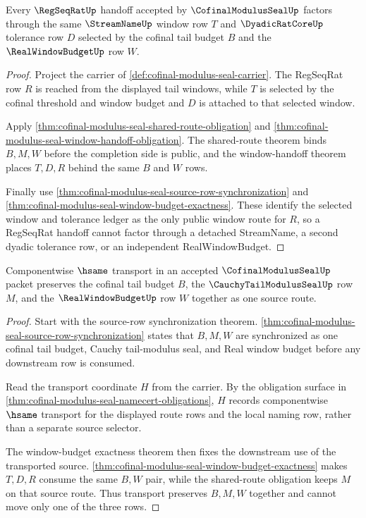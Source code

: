 \begin{theorem}
\label{thm:cofinal-modulus-seal-regseqrat-window-factorization}
Every $\RegSeqRatUp$ handoff accepted by $\CofinalModulusSealUp$ factors through the same $\StreamNameUp$ window row $T$ and $\DyadicRatCoreUp$ tolerance row $D$ selected by the cofinal tail budget $B$ and the $\RealWindowBudgetUp$ row $W$.
\end{theorem}
\begin{proof}
Project the carrier of \autoref{def:cofinal-modulus-seal-carrier}. The RegSeqRat row $R$ is reached from the displayed tail windows, while $T$ is selected by the cofinal threshold and window budget and $D$ is attached to that selected window.

Apply \autoref{thm:cofinal-modulus-seal-shared-route-obligation} and \autoref{thm:cofinal-modulus-seal-window-handoff-obligation}. The shared-route theorem binds $B,M,W$ before the completion side is public, and the window-handoff theorem places $T,D,R$ behind the same $B$ and $W$ rows.

Finally use \autoref{thm:cofinal-modulus-seal-source-row-synchronization} and \autoref{thm:cofinal-modulus-seal-window-budget-exactness}. These identify the selected window and tolerance ledger as the only public window route for $R$, so a RegSeqRat handoff cannot factor through a detached StreamName, a second dyadic tolerance row, or an independent RealWindowBudget.
\end{proof}

\begin{theorem}
\label{thm:cofinal-modulus-seal-tail-budget-transport}
Componentwise $\hsame$ transport in an accepted $\CofinalModulusSealUp$ packet preserves the cofinal tail budget $B$, the $\CauchyTailModulusSealUp$ row $M$, and the $\RealWindowBudgetUp$ row $W$ together as one source route.
\end{theorem}
\begin{proof}
Start with the source-row synchronization theorem. \autoref{thm:cofinal-modulus-seal-source-row-synchronization} states that $B,M,W$ are synchronized as one cofinal tail budget, Cauchy tail-modulus seal, and Real window budget before any downstream row is consumed.

Read the transport coordinate $H$ from the carrier. By the obligation surface in \autoref{thm:cofinal-modulus-seal-namecert-obligations}, $H$ records componentwise $\hsame$ transport for the displayed route rows and the local naming row, rather than a separate source selector.

The window-budget exactness theorem then fixes the downstream use of the transported source. \autoref{thm:cofinal-modulus-seal-window-budget-exactness} makes $T,D,R$ consume the same $B,W$ pair, while the shared-route obligation keeps $M$ on that source route. Thus transport preserves $B,M,W$ together and cannot move only one of the three rows.
\end{proof}

